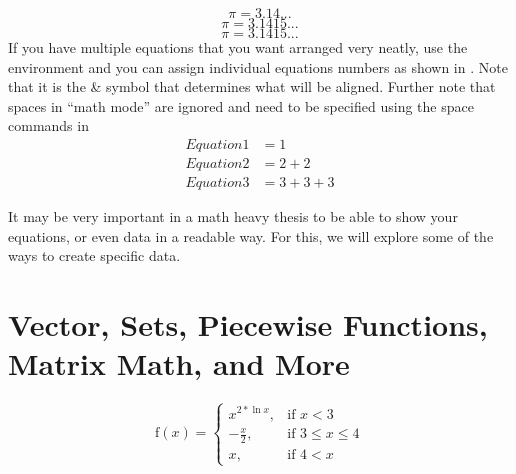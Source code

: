 	\begin{equation}
		\label{eq:Eq}
		\pi = 3.14...
	\end{equation}
	\begin{equation*}
		\tag{Constant pi}\label{eq:pi}
		\pi = 3.1415...
	\end{equation*}
	\begin{equation*}
		\tag*{Constant pi}\label{eq:otherpi}
		\pi = 3.1415...
	\end{equation*}
	If you have multiple equations that you want arranged very neatly, use the  environment and you can assign individual equations numbers as shown in .
	Note that it is the \& symbol that determines what will be aligned.
	Further note that spaces in \enquote{math mode} are ignored and need to be specified using the space commands in %
	\begin{align}%
		\label{eq:multiref:a} Equation1 &= 1\\
		\label{eq:multiref:b} Equation2 &= 2 + 2\\
		\label{eq:multiref:c} Equation3 &= 3 + 3 + 3
	\end{align}
	
	
	
	
	
	It may be very important in a math heavy thesis to be able to show your equations, or even data in a readable way. 
	For this, we will explore some of the ways to create specific data.

	\section{Vector, Sets, Piecewise Functions, Matrix Math, and More}
		\begin{equation}
			\text{f}(x) = 
				\begin{cases}
					x^{2*\ln{x}},&\text{if }x<3\\
					-\frac{x}{2},&\text{if }3\leq{}x\leq{}4\\
					x,&\text{if }4<x
				\end{cases}
		\end{equation}
	
